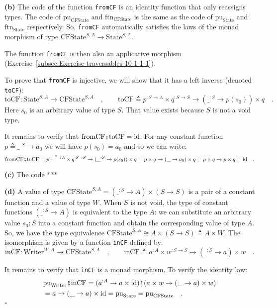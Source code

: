 \textbf{(b)} The code of the function \lstinline!fromCF! is an identity
function that only reassigns types. The code of $\text{pu}_{\text{CFState}}$
and $\text{ftn}_{\text{CFState}}$ is the same as the code of $\text{pu}_{\text{State}}$
and $\text{ftn}_{\text{State}}$ respectively. So, \lstinline!fromCF!
automatically satisfies the laws of the monad morphism of type $\text{CFState}^{S,A}\rightarrow\text{State}^{S,A}$. 

The function \lstinline!fromCF! is then also an applicative morphism
(Exercise~\ref{subsec:Exercise-traversables-10-1-1-1}).

To prove that \lstinline!fromCF! is injective, we will show that
it has a left inverse (denoted \lstinline!toCF!):
\[
\text{toCF}:\text{State}^{S,A}\rightarrow\text{CFState}^{S,A}\quad,\quad\quad\text{toCF}\triangleq p^{:S\rightarrow A}\times q^{:S\rightarrow S}\rightarrow(\_^{:S}\rightarrow p(s_{0}))\times q\quad.
\]
Here $s_{0}$ is an arbitrary value of type $S$. That value exists
because $S$ is not a void type.

It remains to verify that $\text{fromCF}\bef\text{toCF}=\text{id}$.
For any constant function $p\triangleq\_^{:S}\rightarrow a_{0}$ we
will have $p(s_{0})=a_{0}$ and so we can write:
\[
\text{fromCF}\bef\text{toCF}=p^{:\_^{:S}\rightarrow A}\times q^{:S\rightarrow S}\rightarrow(\_^{:S}\rightarrow p(s_{0}))\times q=p\times q\rightarrow(\_\rightarrow a_{0})\times q=p\times q\rightarrow p\times q=\text{id}\quad.
\]

\textbf{(c)} The code {*}{*}{*}

\textbf{(d)} A value of type $\text{CFState}^{S,A}=(\_^{:S}\rightarrow A)\times(S\rightarrow S)$
is a pair of a constant function and a value of type $W$. When $S$
is not void, the type of constant functions $(\_^{:S}\rightarrow A)$
is equivalent to the type $A$: we can substitute an arbitrary value
$s_{0}:S$ into a constant function and obtain the corresponding value
of type $A$. So, we have the type equivalence $\text{CFState}^{S,A}\cong A\times(S\rightarrow S)\triangleq A\times W$.
The isomorphism is given by a function \lstinline!inCF! defined by:
\[
\text{inCF}:\text{Writer}^{W,A}\rightarrow\text{CFState}^{S,A}\quad,\quad\quad\text{inCF}\triangleq a^{:A}\times w^{:S\rightarrow S}\rightarrow(\_^{:S}\rightarrow a)\times w\quad.
\]

It remains to verify that \lstinline!inCF! is a monad morphism. To
verify the identity law:
\begin{align*}
 & \text{pu}_{\text{Writer}}\bef\text{inCF}=(a^{:A}\rightarrow a\times\text{id})\bef(a\times w\rightarrow(\_\rightarrow a)\times w)\\
 & =a\rightarrow(\_\rightarrow a)\times\text{id}=\text{pu}_{\text{State}}=\text{pu}_{\text{CFState}}\quad.
\end{align*}
$\square$

